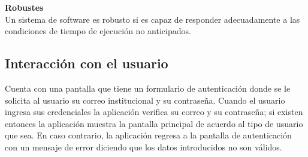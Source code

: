 \textbf{Robustes\\}
Un sistema de software es robusto si es capaz de responder adecuadamente a las condiciones de tiempo de ejecución no anticipados.\\


\subsection{Interacción con el usuario}

Cuenta con una pantalla que tiene un formulario de autenticación donde se le solicita al usuario su correo institucional y su contraseña. Cuando el usuario ingresa sus credenciales la aplicación verifica su correo y su contraseña; si existen entonces la aplicación muestra la pantalla principal de acuerdo al tipo de usuario que sea. En caso contrario, la aplicación regresa a la pantalla de autenticación con un mensaje de error diciendo que los datos introducidos no son válidos.
